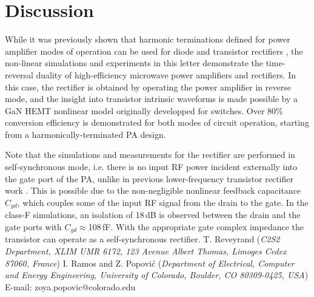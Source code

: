 \documentclass[twocolumn]{el-author}
\begin{document}
\section{Discussion}
While it was previously shown that harmonic terminations defined for power amplifier modes of operation can be used for diode and transistor rectifiers \cite{4}, the non-linear simulations and experiments in this letter demonstrate the time-reversal duality of high-efficiency microwave power amplifiers and rectifiers. In this case, the rectifier is obtained by operating the power amplifier in reverse mode, and the insight into transistor intrinsic waveforms is made possible by a GaN HEMT nonlinear model originally developped for switches. Over 80\% conversion efficiency is demonstrated for both modes of circuit operation, starting from a harmonically-terminated PA design.  

Note that the simulations and measurements for the rectifier are performed in self-synchronous mode, i.e. there is no input RF power incident externally into the gate port of the PA, unlike in previous lower-frequency transistor rectifier work \cite{5}\cite{6}. This is possible due to the non-negligible nonlinear feedback capacitance $C_{gd}$, which couples some of the input RF signal from the drain to the gate. In the class-F simulations, an isolation of 18\,dB is observed between the drain and the gate ports with $C_{gd}\approx$108\,fF. With the appropriate gate complex impedance the transistor can operate as a self-synchronous rectifier. 
%
%
\vskip3pt
%
\vskip5pt
%
\noindent T. Reveyrand (\textit{C2S2 Department, XLIM UMR 6172, 123 Avenue Albert Thomas, Limoges Cedex 87060, France})
\vskip3pt
%
\noindent I. Ramos and Z. Popovi\'c (\textit{Department of Electrical, Computer and Energy Engineering, University of Colorado, Boulder, CO 80309-0425, USA})
\vskip3pt
%
\noindent E-mail: zoya.popovic@colorado.edu
\end{document}
